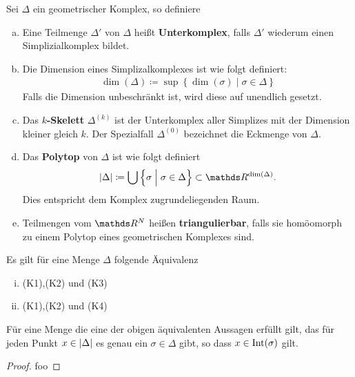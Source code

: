 \begin{Def}
  Sei $\Delta$ ein geometrischer Komplex, so definiere
  \begin{enumerate}[(a)]
  \item Eine Teilmenge $\Delta'$ von $\Delta$ heißt
    \textbf{Unterkomplex}, falls $\Delta'$ wiederum einen
    Simplizialkomplex bildet.
  \item Die Dimension eines Simplizalkomplexes ist wie folgt
    definiert:
    \begin{gather*}
      \dim(\Delta) \coloneqq \sup \left\{ \dim(\sigma) \; \Big| \;
        \sigma \in \Delta \right\}
    \end{gather*}
    Falls die Dimension unbeschränkt ist, wird diese auf unendlich
    gesetzt.
  \item Das \textbf{$k$-Skelett} $\Delta^{(k)}$ ist der Unterkomplex
    aller Simplizes mit der Dimension kleiner gleich $k$. Der
    Spezialfall $\Delta^{(0)}$ bezeichnet die Eckmenge von $\Delta$.
  \item Das \textbf{Polytop} von $\Delta$ ist wie folgt definiert
    \begin{gather*}
      |\Delta| \coloneqq \bigcup \left\{ \sigma \; \Big| \; \sigma \in
        \Delta \right\} \subset \R^{\dim(\Delta)}.
    \end{gather*}
    Dies entspricht dem Komplex zugrundeliegenden Raum.
  \item Teilmengen vom $\R^N$ heißen \textbf{triangulierbar}, falls
    sie homöomorph zu einem Polytop eines geometrischen Komplexes sind.
  \end{enumerate}
\end{Def}

\begin{Lem}\label{lem:eindeutigSimplex}
  Es gilt für eine Menge $\Delta$ folgende Äquivalenz
  \begin{enumerate}[(i)]\normalfont
  \item (K1),(K2) und (K3)
  \item (K1),(K2) und (K4)
  \end{enumerate}
  Für eine Menge die eine der obigen äquivalenten Aussagen erfüllt
  gilt, das für jeden Punkt $x \in \left| \Delta \right|$ es genau ein
  $\sigma \in \Delta$ gibt, so dass $x \in \operatorname{Int}(\sigma)$ gilt.
  \begin{proof}
    foo
  \end{proof}
\end{Lem}



